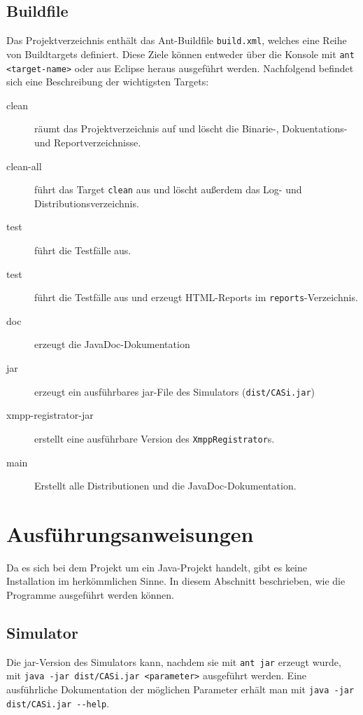 \subsection{Buildfile}
Das Projektverzeichnis enthält das Ant-Buildfile \texttt{build.xml}, welches eine Reihe von Buildtargets definiert. Diese Ziele können entweder über die Konsole mit \texttt{ant <target-name>} oder aus Eclipse heraus ausgeführt werden. Nachfolgend befindet sich eine Beschreibung der wichtigsten Targets:
\begin{description}
	\item[clean] räumt das Projektverzeichnis auf und löscht die Binarie-, Dokuentations- und Reportverzeichnisse.
	\item[clean-all] führt das Target \texttt{clean} aus und löscht außerdem das Log- und Distributionsverzeichnis.
	\item[test] führt die Testfälle aus.
	\item[test] führt die Testfälle aus und erzeugt HTML-Reports im \texttt{reports}-Verzeichnis.
	\item[doc] erzeugt die JavaDoc-Dokumentation
	\item[jar] erzeugt ein ausführbares jar-File des Simulators (\texttt{dist/CASi.jar})
	\item[xmpp-registrator-jar] erstellt eine ausführbare Version des \texttt{XmppRegistrator}s.
	\item[main] Erstellt alle Distributionen und die JavaDoc-Dokumentation.
\end{description}

\section{Ausführungsanweisungen}\label{sec:appendix_install}
Da es sich bei dem Projekt um ein Java-Projekt handelt, gibt es keine Installation im herkömmlichen Sinne. In diesem Abschnitt beschrieben, wie die Programme ausgeführt werden können.
\subsection{Simulator}
Die jar-Version des Simulators kann, nachdem sie mit \texttt{ant jar} erzeugt wurde, mit \texttt{java -jar dist/CASi.jar <parameter>} ausgeführt werden. Eine ausführliche Dokumentation der möglichen Parameter erhält man mit \texttt{java -jar dist/CASi.jar \texttt{-}\texttt{-}help}.
